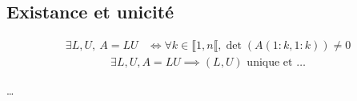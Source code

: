 \documentclass{article}
\begin{document}
\subsection{Existance et unicité}

\begin{theorem}
   \begin{align*}
       \exists L, U, \ A=LU &\iff \forall k\in \llbracket 1, n \llbracket, \det(A(1:k, 1:k)) \neq 0 
   \end{align*} 
   \begin{align*}
       \exists L, U, A=LU \implies (L, U) \text{ unique et }\ldots
   \end{align*}
\end{theorem}

\ldots
\end{document}
